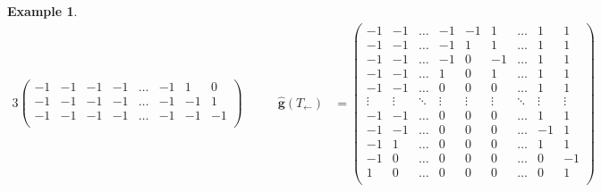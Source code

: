 \documentclass{amsart}
\theoremstyle{definition}
\newtheorem{example}[theorem]{Example}
\renewcommand{\b}[1]{{\boldsymbol{#1}}} %
\begin{document}
\begin{example}
\begin{table}[p]
\begin{alignat*}{3}
\begin{pmatrix}
		-1 & -1 & -1 & -1 & \dots & -1 & 1 & 0 \\
		-1 & -1 & -1 & -1 & \dots & -1 & -1 & 1 \\
		-1 & -1 & -1 & -1 & \dots & -1 & -1 & -1 \\
	\end{pmatrix}
	\qquad &
	\hat{\b{g}}(T_\leftarrow) & = \begin{pmatrix}
		-1 & -1 & \dots & -1 & -1 & 1 & \dots & 1 & 1 \\
		-1 & -1 & \dots & -1 & 1 & 1 & \dots & 1 & 1 \\
		-1 & -1 & \dots & -1 & 0 & -1 & \dots & 1 & 1 \\
		-1 & -1 & \dots & 1 & 0 & 1 & \dots & 1 & 1 \\
		-1 & -1 & \dots & 0 & 0 & 0 & \dots & 1 & 1 \\
		\vdots & \vdots & \ddots & \vdots & \vdots & \vdots & \ddots & \vdots & \vdots \\
		-1 & -1 & \dots & 0 & 0 & 0 & \dots & 1 & 1 \\
		-1 & -1 & \dots & 0 & 0 & 0 & \dots & -1 & 1 \\
		-1 & 1 & \dots & 0 & 0 & 0 & \dots & 1 & 1 \\
		-1 & 0 & \dots & 0 & 0 & 0 & \dots & 0 & -1 \\
		1 & 0 & \dots & 0 & 0 & 0 & \dots & 0 & 1 \\

\end{pmatrix}
\end{alignat*}
\end{table}
\end{example}
\end{document}
